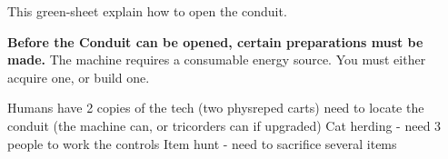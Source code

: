 \documentclass[green]{elementals}
\begin{document}
\name{\gConduit{}}

This green-sheet explain how to open the conduit.

{\bf Before the Conduit can be opened, certain preparations must be made.}
The machine requires a consumable energy source. You must either acquire one, or build one.

Humans have 2 copies of the tech (two physreped carts)
need to locate the conduit (the machine can, or tricorders can if upgraded)
Cat herding - need 3 people to work the controls
Item hunt - need to sacrifice several items
\end{document}

